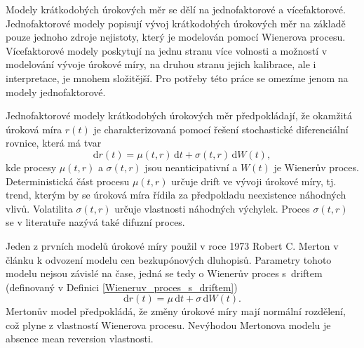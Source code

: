 \documentclass[a4paper,12pt]{report}
\theoremstyle{definition} \newtheorem{definice}[veta]{Definice}
\theoremstyle{remark}
\begin{document}

Modely krátkodobých úrokových měr se dělí na jednofaktorové a vícefaktorové.
Jednofaktorové modely popisují vývoj krátkodobých úrokových měr na základě pouze jednoho zdroje nejistoty, který je modelován pomocí Wienerova procesu.
Vícefaktorové modely poskytují na jednu stranu více volnosti a možností v modelování vývoje úrokové míry, na druhou stranu jejich kalibrace, ale i interpretace, je mnohem složitější. 
Pro potřeby této práce se omezíme jenom na modely jednofaktorové. 

Jednofaktorové modely krátkodobých úrokových měr předpokládají, že okamžitá úroková míra $r(t)$ je charakterizovaná pomocí řešení stochastické diferenciální rovnice, která má tvar
\begin{equation}\label{model_urok_miry}
\mathrm{d}r(t)=\mu(t,r)\,\mathrm{d}t+\sigma(t,r)\,\mathrm{d}W(t),
\end{equation}
kde procesy $\mu(t,r)$ a $\sigma(t,r)$ jsou neanticipativní a $W(t)$ je Wienerův proces.
Deterministická část procesu $\mu(t, r)$ určuje drift ve vývoji úrokové míry, tj. trend, kterým by se úroková míra řídila za předpokladu neexistence náhodných vlivů.
Volatilita $\sigma(t, r)$ určuje vlastnosti náhodných výchylek.
Proces $\sigma(t, r)$ se v literatuře nazývá také difuzní proces.

Jeden z prvních modelů úrokové míry použil v roce 1973 Robert C. Merton v článku \cite{merton1973theory} k odvození modelu cen bezkupónových dluhopisů.
Parametry tohoto modelu nejsou závislé na čase, jedná se tedy o Wienerův proces s~driftem (definovaný v Definici \ref{Wieneruv_proces_s_driftem}) 
\begin{equation}\label{model_urok_miry_Merton}
\mathrm{d}r(t)=\mu\,\mathrm{d}t+\sigma\,\mathrm{d}W(t).
\end{equation}
Mertonův model předpokládá, že změny úrokové míry mají normální rozdělení, což plyne z vlastností Wienerova procesu.
Nevýhodou Mertonova modelu je absence mean reversion vlastnosti.
\end{document}
